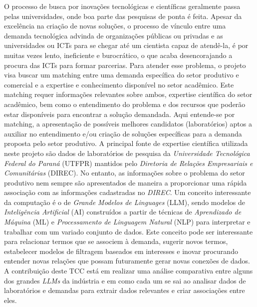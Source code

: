 \begin{resumoutfpr}
    O processo de busca por inovações tecnológicas e científicas geralmente passa pelas universidades, onde boa parte das pesquisas de ponta é feita. Apesar da excelência na criação de novas soluções, o processo de vínculo entre uma demanda tecnológica advinda de organizações públicas ou privadas e as universidades ou ICTs para se chegar até um cientista capaz de atendê-la, é por muitas vezes lento, ineficiente e burocrático, o que acaba desencorajando a procura das ICTs para formar parcerias. Para atender esse problema, o projeto visa buscar um matching entre uma demanda específica do setor produtivo e comercial e a expertise e conhecimento disponível no setor acadêmico. Este matching requer informações relevantes sobre ambos, expertise científica do setor acadêmico, bem como o entendimento do problema e dos recursos que poderão estar disponíveis para encontrar a solução demandada. Aqui entende-se por matching, a apresentação de possíveis melhores candidatos (laboratórios) aptos a auxiliar no entendimento e/ou criação de soluções específicas para a demanda proposta pelo setor produtivo. A principal fonte de expertise científica utilizada neste projeto são dados de laboratórios de pesquisa da \emph{Universidade Tecnológica Federal do Paraná} (UTFPR) mantidos pelo \emph{Diretoria de Relações Empresariais e Comunitárias} (DIREC). No entanto, as informações sobre o problema do setor produtivo nem sempre são apresentados de maneira a proporcionar uma rápida associação com as informações cadastradas no \emph{DIREC}.
    Um conceito interessante da computação é o de \emph{Grande Modelos de Linguages} (LLM), sendo modelos de \emph{Inteligência Artificial} (AI) construídos a partir de técnicas de \emph{Aprendizado de Máquina} (ML) e \emph{Processamento de Linguagem Natural} (NLP) para interpretar e trabalhar com um variado conjunto de dados. Este conceito pode ser interessante para relacionar termos que se associem à demanda, sugerir novos termos, estabelecer modelos de filtragem baseados em interesses e inovar procurando entender novas relações que possam futuramente gerar novas conexões de dados. A contribuição deste TCC está em realizar uma análise comparativa entre alguns dos grandes \emph{LLMs} da indústria e em como cada um se sai ao analisar dados de laboratórios e demandas para extrair dados relevantes e criar associações entre eles.
\end{resumoutfpr}